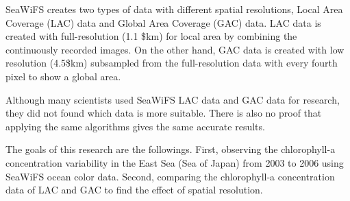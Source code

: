 SeaWiFS creates two types of data with different spatial resolutions, Local Area Coverage (LAC) data and Global Area Coverage (GAC) data. LAC data is created with full-resolution (1.1 \${km}) for local area by combining the continuously recorded images. On the other hand, GAC data is created with low resolution (4.5\${km}) subsampled from the full-resolution data with every fourth pixel to show a global area. 

Although many scientists used SeaWiFS LAC data and GAC data for research, they did not found which data is more suitable. There is also no proof that applying the same algorithms gives the same accurate results. 

The goals of this research are the followings. First, observing the chlorophyll-a concentration variability in the East Sea (Sea of Japan) from 2003 to 2006 using SeaWiFS ocean color data. Second, comparing the chlorophyll-a concentration data of LAC and GAC to find the effect of spatial resolution.
